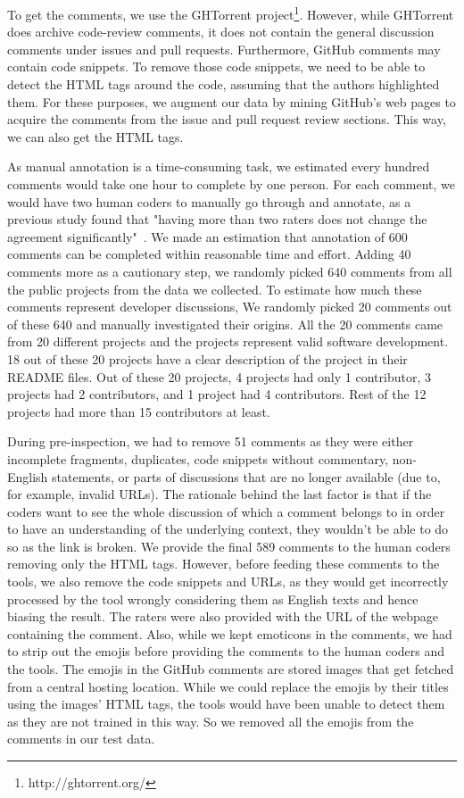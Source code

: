 To get the comments, 
we use the GHTorrent project\footnote{http://ghtorrent.org/}. However, while GHTorrent does archive code-review comments, 
it does not contain the general discussion comments 
under issues and pull requests. 
Furthermore, 
GitHub comments may contain code snippets.
To remove those code snippets, 
we need to be able to detect the HTML tags around the code, 
assuming that the authors highlighted them. 
For these purposes, 
we augment our data by mining GitHub's web pages 
to acquire the comments from the issue and pull request review sections. 
This way, we can also get the HTML tags.

As manual annotation is a time-consuming task, 
we estimated 
every hundred comments 
would take one hour to complete by one person. 
For each comment, 
we would have two human coders to 
manually go through and annotate, 
as a previous study found that 
"having more than two raters 
does not change 
the agreement significantly"~\cite{murgia2014developers}. 
We made an estimation that annotation of 600 comments 
can be completed within reasonable time and effort.
Adding 40 comments more as a cautionary step, 
we randomly picked 640 comments 
from all the public projects from the data we collected.
To estimate how much these comments
represent developer discussions,
We randomly picked 
20 comments out of these 640 
and manually investigated their origins.
All the 20 comments came from 20 different projects 
and the projects represent valid software development.
18 out of these 20 projects have a clear description 
of the project in their README files.
Out of these 20 projects, 
4 projects had only 1 contributor, 
3 projects had 2 contributors, 
and 1 project had 4 contributors.
Rest of the 12 projects had more than 15 contributors at least.

During pre-inspection, 
we had to remove 51 comments as they were 
either incomplete fragments, 
duplicates, 
code snippets without commentary, 
non-English statements, 
or parts of discussions that are no longer available 
(due to, for example, invalid URLs). 
The rationale behind the last factor is that 
if the coders want to see the whole discussion 
of which a comment belongs to
in order to have an understanding 
of the underlying context, 
they wouldn't be able to do so as the link is broken. 
We provide the final 589 comments to the human coders 
removing only the HTML tags. 
However, before feeding these comments to the tools, 
we also remove the code snippets and URLs, 
as they would get incorrectly processed by the tool 
wrongly considering them as English texts 
and hence biasing the result. 
The raters were also provided with the URL of the webpage 
containing the comment.
Also, while we kept emoticons in the comments, 
we had to strip out the emojis 
before providing the comments 
to the human coders and the tools.
The emojis in the GitHub comments 
are stored images 
that get fetched from a central hosting location.
While we could replace the emojis 
by their titles using the images' HTML tags, 
the tools would have been unable to detect them 
as they are not trained in this way.
So we removed all the emojis 
from the comments in our test data.

